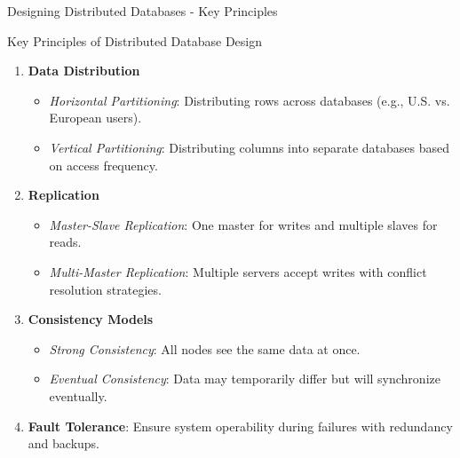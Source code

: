 \documentclass[aspectratio=169]{beamer}
\begin{document}
\begin{frame}[fragile]{Designing Distributed Databases - Key Principles}
    \begin{block}{Key Principles of Distributed Database Design}
        \begin{enumerate}
            \item \textbf{Data Distribution}
            \begin{itemize}
                \item \textit{Horizontal Partitioning}: Distributing rows across databases (e.g., U.S. vs. European users).
                \item \textit{Vertical Partitioning}: Distributing columns into separate databases based on access frequency.
            \end{itemize}

            \item \textbf{Replication}
            \begin{itemize}
                \item \textit{Master-Slave Replication}: One master for writes and multiple slaves for reads.
                \item \textit{Multi-Master Replication}: Multiple servers accept writes with conflict resolution strategies.
            \end{itemize}

            \item \textbf{Consistency Models}
            \begin{itemize}
                \item \textit{Strong Consistency}: All nodes see the same data at once.
                \item \textit{Eventual Consistency}: Data may temporarily differ but will synchronize eventually.
            \end{itemize}

            \item \textbf{Fault Tolerance}: Ensure system operability during failures with redundancy and backups.
        \end{enumerate}
    \end{block}
\end{frame}
\end{document}
